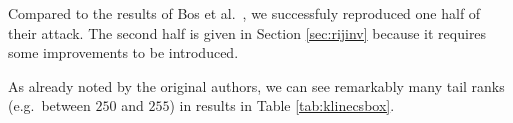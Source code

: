 	Compared to the results of Bos et al.\ \cite{bos2015differential}, we successfuly reproduced one half of their attack. The second half is given in Section \ref{sec:rijinv} because it requires some improvements to be introduced.
	
	\begin{note}
	\label{note:tailrank}
		As already noted by the original authors, we can see remarkably many tail ranks (e.g.\ between $250$ and $255$) in results in Table \ref{tab:klinecsbox}.
	\end{note}




